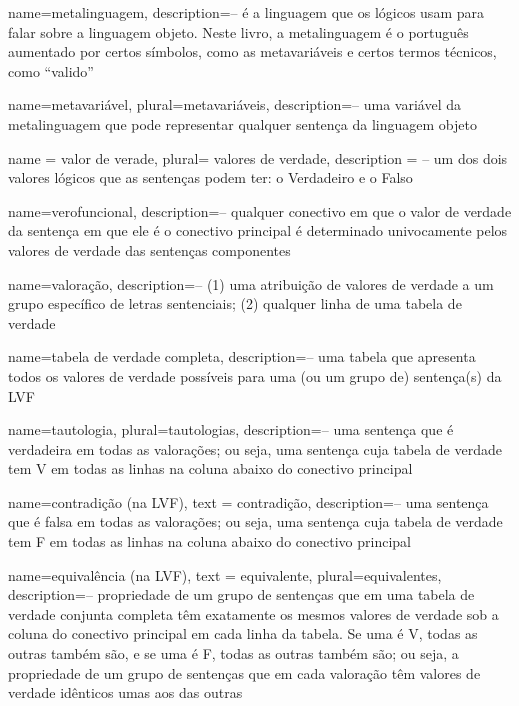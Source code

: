 {
name=metalinguagem,
description={-- é a linguagem que os lógicos usam para falar sobre a linguagem objeto. Neste livro, a metalinguagem é o português aumentado por certos símbolos, como as metavariáveis e certos termos técnicos, como ``valido''}
}

{
name=metavariável,
plural=metavariáveis,
description={-- uma variável da metalinguagem que pode representar qualquer sentença da linguagem objeto}
}

{
name = valor de verade,
plural= valores de verdade,
description = {-- um dos dois valores lógicos que as sentenças podem ter: o Verdadeiro e o Falso}
}

{
name=verofuncional,
description={-- qualquer conectivo em que o valor de verdade da sentença em que ele é o conectivo principal é determinado univocamente pelos valores de verdade das sentenças componentes}
}

{
name=valoração,
description={-- (1) uma atribuição de valores de verdade a um grupo específico de letras sentenciais; (2) qualquer linha de uma tabela de verdade}
}

{
name=tabela de verdade completa,
description={-- uma tabela que apresenta todos os valores de verdade possíveis para uma (ou um grupo de) sentença(s) da LVF}
}

{
name=tautologia,
plural=tautologias,
description={-- uma sentença que é verdadeira em todas as valorações; ou seja, uma sentença cuja tabela de verdade tem V em todas as linhas na coluna abaixo do conectivo principal}
}

{
  name=contradição (na LVF),
  text = contradição,
description={-- uma sentença que é falsa em todas as valorações; ou seja, uma sentença cuja tabela de verdade tem F em todas as linhas na coluna abaixo do conectivo principal}
}

{
  name=equivalência (na LVF),
  text = equivalente,
  plural=equivalentes,
description={-- propriedade de um grupo de sentenças que em uma tabela de verdade conjunta completa têm exatamente os mesmos valores de verdade sob a coluna do conectivo principal em cada linha da tabela. Se uma é V, todas as outras também são, e se uma é F, todas as outras também são; ou seja, a propriedade de um grupo de sentenças que em cada valoração têm valores de verdade idênticos umas aos das outras}
}

